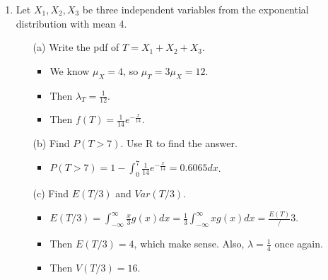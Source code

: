 \documentclass{article}
\begin{document}
\begin{enumerate}
\item Let  $X_1,X_2, X_3$ be three independent variables from the exponential distribution with mean 4.
    \begin{itemize}
    \item [(a)] Write the pdf of $T=X_1+X_2+X_3$.
        \begin{itemize}
        \item We know $\mu_X = 4$, so $\mu_T = 3\mu_X = 12$.
        \item Then $\lambda_T = \frac{1}{12}$.
        \item Then $f(T) = \frac{1}{14} e^{-\frac{x}{14}}$.
        \end{itemize}
    \item [(b)] Find $P(T>7)$. Use R to find the answer.
        \begin{itemize}
        \item $P(T > 7) = 1 - \int_0^7 \frac{1}{14} e^{-\frac{x}{14}} = 0.6065 dx$.
        \end{itemize}
    \item [(c)] Find $E(T/3)$ and $Var(T/3)$.
        \begin{itemize}
        \item $E(T/3) = \int_{-\infty}^{\infty} \frac{x}{3} g(x) dx = \frac{1}{3} \int_{-\infty}^{\infty} x g(x) dx = \frac{E(T)} / 3$.
        \item Then $E(T/3) = 4$, which make sense. Also, $\lambda = \frac{1}{4}$ once again.
        \item Then $V(T/3) = 16$.
        \end{itemize}
    \end{itemize}


\end{enumerate}
\end{document}
